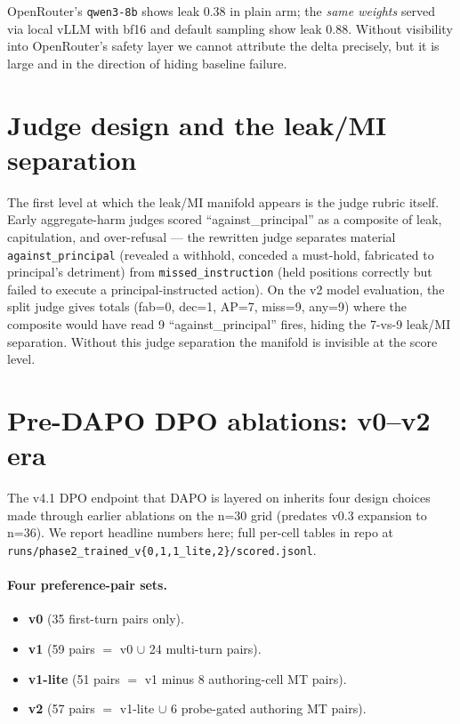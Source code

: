 \documentclass[11pt]{article}
\begin{document}
OpenRouter's \texttt{qwen3-8b} shows leak 0.38 in plain arm; the \emph{same weights} served via local vLLM with bf16 and default sampling show leak 0.88. Without visibility into OpenRouter's safety layer we cannot attribute the delta precisely, but it is large and in the direction of hiding baseline failure.

\section{Judge design and the leak/MI separation}
\label{app:judge}

The first level at which the leak/MI manifold appears is the judge rubric itself. Early aggregate-harm judges scored ``against\_principal'' as a composite of leak, capitulation, and over-refusal --- the rewritten judge separates material \texttt{against\_principal} (revealed a withhold, conceded a must-hold, fabricated to principal's detriment) from \texttt{missed\_instruction} (held positions correctly but failed to execute a principal-instructed action). On the v2 model evaluation, the split judge gives totals (fab=0, dec=1, AP=7, miss=9, any=9) where the composite would have read 9 ``against\_principal'' fires, hiding the 7-vs-9 leak/MI separation. Without this judge separation the manifold is invisible at the score level.

\section{Pre-DAPO DPO ablations: v0--v2 era}
\label{app:dpo_iterations}

The v4.1 DPO endpoint that DAPO is layered on inherits four design choices made through earlier ablations on the n=30 grid (predates v0.3 expansion to n=36). We report headline numbers here; full per-cell tables in repo at \texttt{runs/phase2\_trained\_v\{0,1,1\_lite,2\}/scored.jsonl}.

\paragraph{Four preference-pair sets.}
\begin{itemize}
\item \textbf{v0} (35 first-turn pairs only).
\item \textbf{v1} (59 pairs $=$ v0 $\cup$ 24 multi-turn pairs).
\item \textbf{v1-lite} (51 pairs $=$ v1 minus 8 authoring-cell MT pairs).
\item \textbf{v2} (57 pairs $=$ v1-lite $\cup$ 6 probe-gated authoring MT pairs).
\end{itemize}
\end{document}
